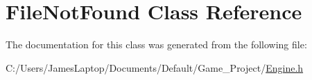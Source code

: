 \hypertarget{class_file_not_found}{}\section{File\+Not\+Found Class Reference}
\label{class_file_not_found}


The documentation for this class was generated from the following file\+:\begin{DoxyCompactItemize}
\item 
C\+:/\+Users/\+James\+Laptop/\+Documents/\+Default/\+Game\+\_\+\+Project/\hyperlink{_engine_8h}{Engine.\+h}\end{DoxyCompactItemize}
